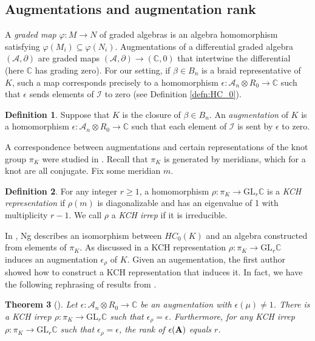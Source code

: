 \documentclass[11pt]{amsart}
\def\C{{\mathbb C}}
\def\A{{\mathcal A}}
\newtheorem{thm}{Theorem}[section]
\theoremstyle{definition}
\newtheorem{defn}[thm]{Definition}
\begin{document}
\subsection{Augmentations and augmentation rank}
\label{SecBG_AugRk}

  A \emph{graded map} $\varphi\colon M\rightarrow N$ of graded algebras is an algebra homomorphism satisfying $\varphi(M_i)\subseteq \varphi(N_i)$.  Augmentations of a differential graded algebra $(\A,\partial)$ are graded maps $(\A,\partial)\to (\C,0)$ that intertwine the differential (here $\C$ has grading zero). For our setting, if $\beta\in B_n$ is a braid representative of $K$, such a map corresponds precisely to a homomorphism $\epsilon:\A_n\otimes R_0\to\C$ such that $\epsilon$ sends elements of $\mathcal I$ to zero (see Definition \ref{defn:HC_0}).

  \begin{defn}
  Suppose that $K$ is the closure of $\beta\in B_n$. An \emph{augmentation} of $K$ is a homomorphism $\epsilon: \A_n\otimes R_0\rightarrow \C$ such that each element of $\mathcal I$ is sent by $\epsilon$ to zero.
  \label{defn:Aug}
  \end{defn}

  A correspondence between augmentations and certain representations of the knot group $\pi_K$ were studied in \cite{Cor13a}. Recall that $\pi_K$ is generated by meridians, which for a knot are all conjugate. Fix some meridian $m$.

  \begin{defn}
  For any integer $r\ge1$, a homomorphism $\rho:\pi_K\to\text{GL}_r\C$ is a \emph{KCH representation} if $\rho(m)$ is diagonalizable and has an eigenvalue of 1 with multiplicity $r-1$. We call $\rho$ a \emph{KCH irrep} if it is irreducible.
  \label{defn:KCHReps}
  \end{defn}

  In \cite{Ng08}, Ng describes an isomorphism between $HC_0(K)$ and an algebra constructed from elements of $\pi_K$. As discussed in \cite{Ng12} a KCH representation $\rho:\pi_K\to\text{GL}_r\C$ induces an augmentation $\epsilon_\rho$ of $K$. Given an augementation, the first author showed how to construct a KCH representation that induces it. In fact, we have the following rephrasing of results from \cite{Cor13a}.

  \begin{thm}[\cite{Cor13a}]
  Let $\epsilon:\A_n\otimes R_0\to\C$ be an augmentation with $\epsilon(\mu)\ne 1$. There is a KCH irrep $\rho:\pi_K\to\text{GL}_r\C$ such that $\epsilon_\rho=\epsilon$. Furthermore, for any KCH irrep $\rho:\pi_K\to\text{GL}_r\C$ such that $\epsilon_\rho = \epsilon$, the rank of $\epsilon({\bf A})$ equals $r$.
  \label{thm:AugKCH_Corresp}
  \end{thm}
\end{document}
